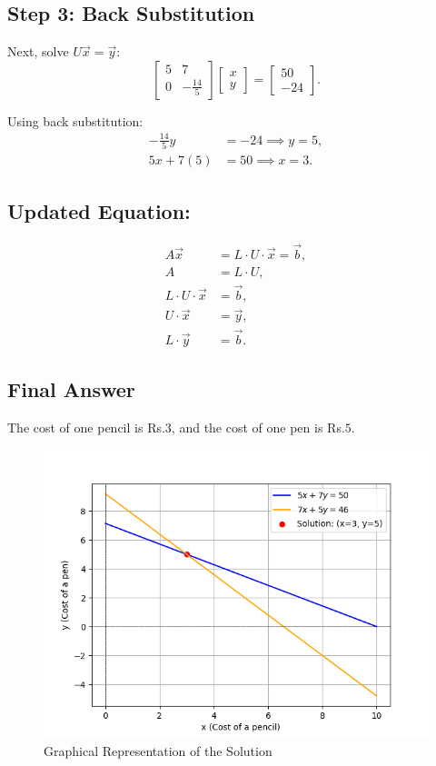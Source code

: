 \documentclass[journal]{IEEEtran}
\newcommand{\myvec}[1]{\begin{bmatrix}#1\end{bmatrix}}
\begin{document}
\subsection{Step 3: Back Substitution}
Next, solve \(U\vec{x} = \vec{y}\):
\begin{equation}
    \myvec{5 & 7 \\ 0 & -\frac{14}{5}} \myvec{x \\ y} = \myvec{50 \\ -24}.
\end{equation}

Using back substitution:
\begin{align}
    -\frac{14}{5}y &= -24 \implies y = 5, \\
    5x + 7(5) &= 50 \implies x = 3.
\end{align}

\subsection{Updated Equation:}
\begin{align}
    A\vec{x} &= L \cdot U \cdot \vec{x} = \vec{b}, \\
    A &= L \cdot U, \\
    L \cdot U \cdot \vec{x} &= \vec{b}, \\
    U \cdot \vec{x} &= \vec{y}, \\
    L \cdot \vec{y} &= \vec{b}.
\end{align}

\subsection{Final Answer}
The cost of one pencil is Rs.\(3\), and the cost of one pen is Rs.\(5\).

\begin{figure}[h!]
   \centering
   \includegraphics[width=0.7\columnwidth]{figs/fig.png}
    \caption{Graphical Representation of the Solution}
\end{figure}
\end{document}

